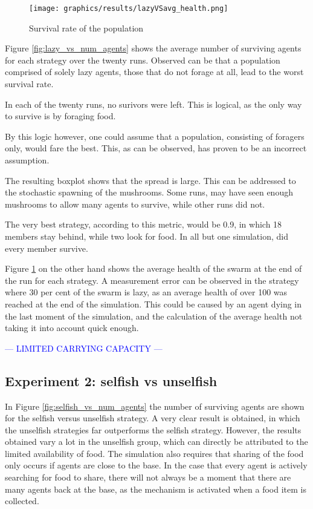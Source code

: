 \begin{figure}[H]
    \centering
    \texttt{[image: graphics/results/lazyVSavg\_health.png]}
    \caption{Survival rate of the population}
    \label{fig:lazy_vs_average_health}
\end{figure}

Figure \ref{fig:lazy_vs_num_agents} shows the average number of surviving agents for each strategy over the twenty runs.
Observed can be that a population comprised of solely lazy agents, those that do not forage at all,
lead to the worst survival rate.

In each of the twenty runs, no surivors were left.
This is logical, as the only way to survive is by foraging food.

By this logic however, one could assume that a population, consisting of foragers only, would fare the best.
This, as can be observed, has proven to be an incorrect assumption.

The resulting boxplot shows that the spread is large.
This can be addressed to the stochastic spawning of the mushrooms.
Some runs, may have seen enough mushrooms to allow many agents to survive, while other runs did not.

The very best strategy, according to this metric, would be 0.9, in which 18 members stay behind, while two look for food.
In all but one simulation, did every member survive.


Figure \ref{fig:lazy_vs_average_health} on the other hand shows the average health of the swarm at the end of the run for each strategy.
A measurement error can be observed in the strategy where 30 per cent of the swarm is lazy, as an average health of over 100 was reached at the end of the simulation.
This could be caused by an agent dying in the last moment of the simulation, and the calculation of the average health not taking it into account quick enough.

\textcolor{blue}{---
LIMITED CARRYING CAPACITY
---}

\textcolor{purple}{
    \blindtext
    \blindtext
}

\subsection*{Experiment 2: selfish vs unselfish}

In Figure \ref{fig:selfish_vs_num_agents} the number of surviving agents are shown for the selfish versus unselfish strategy.
A very clear result is obtained, in which the unselfish strategies far outperforms the selfish strategy.
However, the results obtained vary a lot in the unselfish group, which can directly be attributed to the limited availability of food.
The simulation also requires that sharing of the food only occurs if agents are close to the base.
In the case that every agent is actively searching for food to share, 
there will not always be a moment that there are many agents back at the base, as the mechanism is activated when a food item is collected.



